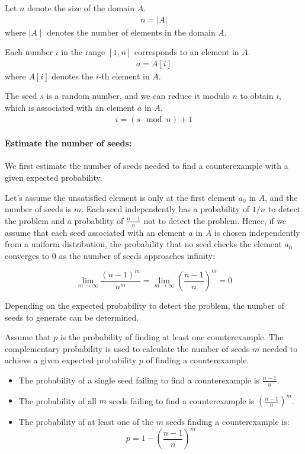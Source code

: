 \documentclass[runningheads]{llncs}
\begin{document}
Let \( n \) denote the size of the domain \( A \). 
\begin{align}
n = |A|
\end{align}
where $\mid A \mid$ denotes the number of elements in the domain $A$.

Each number \( i \) in the range \([1, n]\) corresponds to an element in \( A \). 
\begin{align}
a=A[i]
\end{align}
where $A[i]$ denotes the $i$-th element in $A$.

The seed \( s \) is a random number, and we can reduce it modulo \( n \) to obtain \( i \), which is associated with an element \( a \) in \( A \).
\begin{align}
i = (s \mod n) + 1
\end{align}

\paragraph{Estimate the number of seeds:} We first estimate the number of seeds needed to find a counterexample with a given expected probability. %

Let's assume the unsatisfied element is only at the first element $a_0$ in $A$, and the number of seeds is $m$. Each seed independently has a probability of $1/n$ to detect the problem and a probability of $\frac{n-1}{n}$ not to detect the problem. Hence, if we assume that each seed associated with an element $a$ in $A$ is chosen independently from a uniform distribution, the probability that no seed checks the element $a_0$ converges to $0$ as the number of seeds approaches infinity:

\[
  \lim_{m \to \infty} \frac{(n-1)^m}{n^m} = \lim_{m \to \infty} \left( \frac{n-1}{n} \right)^m = 0
\]

Depending on the expected probability to detect the problem, the number of seeds to generate can be determined. 

Assume that $p$ is the probability of finding at least one counterexample. The complementary probability is used to calculate the number of seeds $m$ needed to achieve a given expected probability $p$ of finding a counterexample.
\begin{itemize}
\item The probability of a single seed failing to find a counterexample is $\frac{n-1}{n}$.
\item The probability of all $m$ seeds failing to find a counterexample is $\left(\frac{n-1}{n}\right)^m$.
\item The probability of at least one of the $m$ seeds finding a counterexample is:
\[
p = 1 - \left(\frac{n-1}{n}\right)^m
\]
\end{itemize}  
\end{document}
